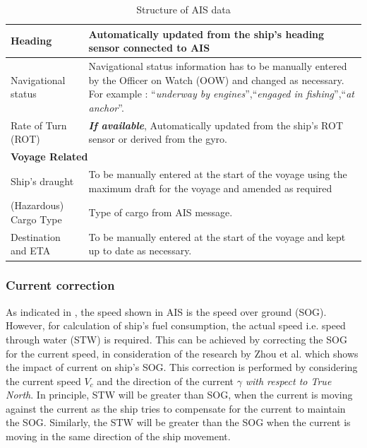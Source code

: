 \begin{table}
{\begin{tabular}{ |p{6cm}|p{9cm}|  }
    \hline
    Heading & Automatically updated from the ship's heading sensor connected to AIS\\
    \hline
    Navigational status & Navigational status information has to be manually entered by the Officer on Watch (OOW) and changed as necessary. For example : ``\emph{underway by engines}'',``\emph{engaged in fishing}'',``\emph{at anchor}''.\\
    \hline
    Rate of Turn (ROT) & \emph{\textbf{If available}}, Automatically updated from the ship's ROT sensor or derived from
    the gyro.\\
    \hline
    \multicolumn{2}{|l|}{\textbf{Voyage Related}}\\
    \hline
    Ship's draught & To be manually entered at the start of the voyage using the
    maximum draft for the voyage and amended as required \\
    \hline 
    (Hazardous) Cargo Type & Type of cargo from AIS message.\\
    \hline
    Destination and ETA & To be manually entered at the start of the voyage and kept up to
    date as necessary.\\
    \hline
    \end{tabular}}
\caption{Structure of AIS data \cite{webimo.2014}}\label{AIS_struct}
\end{table}

\subsubsection{Current correction}\label{curr_corr}

As indicated in , the speed shown in AIS is the speed over ground (SOG). However, for calculation of ship's fuel consumption, the actual speed i.e. speed through water (STW) is required. This can be achieved by correcting the SOG for the current speed, in consideration of the research by Zhou et al. \cite{Zhou.2017} which shows the impact of current on ship's SOG. This correction is performed by considering the current speed $V_c$ and the direction of the current $\gamma$ \emph{with respect to True North}. In principle, STW will be greater than SOG, when the current is moving against the current as the ship tries to compensate for the current to maintain the SOG. Similarly, the STW will be greater than the SOG when the current is moving in the same direction of the ship movement. \\

